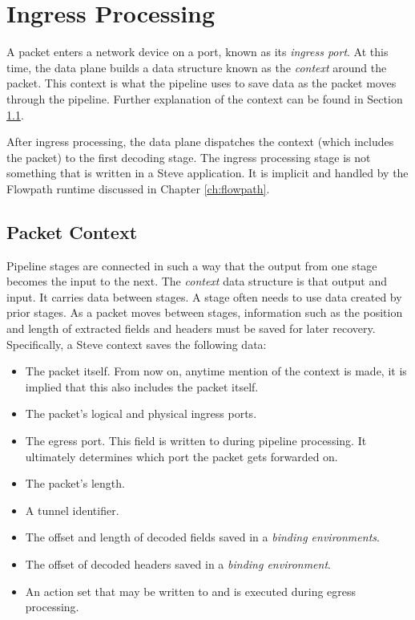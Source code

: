\section{Ingress Processing} \label{ingress_desc}

A packet enters a network device on a port, known as its \textit{ingress port}.
At this time, the data plane builds a data structure known as the
\textit{context} around the packet. This context is what the pipeline
uses to save data as the packet moves through the pipeline. Further explanation
of the context can be found in Section \ref{context_desc}.

After ingress processing, the data plane dispatches the context (which includes
the packet) to the first decoding stage. The ingress processing stage is not something that is written in a Steve
application. It is implicit and handled by the Flowpath runtime discussed in
Chapter \ref{ch:flowpath}. 

\subsection{Packet Context} \label{context_desc}

Pipeline stages are connected in such a way that the output from one stage
becomes the input to the next. The \textit{context} data structure is that
output and input. It carries data between stages. A stage often needs to use
data created by prior stages. As a packet moves between stages, information such
as the position and length of extracted fields and headers must be saved for
later recovery. Specifically, a Steve context
saves the following data:

\begin{itemize}
\item The packet itself. From now on, anytime mention of the context is made, it
is implied that this also includes the packet itself.
\item The packet's logical and physical ingress ports.
\item The egress port. This field is written to during pipeline processing. It ultimately determines which port the packet gets forwarded on.
\item The packet's length.
\item A tunnel identifier.
\item The offset and length of decoded fields saved in a \textit{binding environments}.
\item The offset of decoded headers saved in a \textit{binding environment}.
\item An action set that may be written to and is executed during egress
processing.
\end{itemize}

